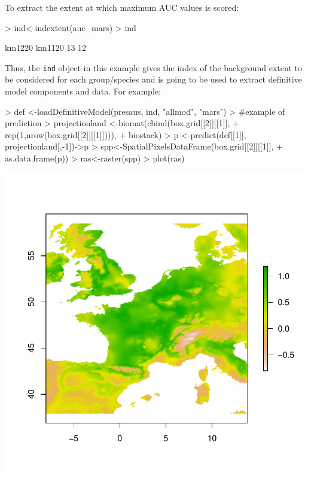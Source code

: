 \documentclass[10pt,a4paper]{report}
\begin{document}
To extract the extent at which maximum AUC values is scored:

\begin{Schunk}
\begin{Sinput}
> ind<-indextent(auc_mars)
> ind
\end{Sinput}
\begin{Soutput}
km1220 km1120 
    13     12 
\end{Soutput}
\end{Schunk}

Thus, the \texttt{ind} object in this example gives the index of the background extent to be considered for each group/species and is going to be used to extract definitive model components and data. For example:

\begin{Schunk}
\begin{Sinput}
> def <-loadDefinitiveModel(presaus, ind, "allmod", "mars")
> #example of prediction
> projectionland <-biomat(cbind(box.grid[[2]][[1]], 
+                     rep(1,nrow(box.grid[[2]][[1]]))), 
+                     biostack)
> p <-predict(def[[1]], projectionland[,-1])->p
> spp<-SpatialPixelsDataFrame(box.grid[[2]][[1]], 
+                             as.data.frame(p))
> ras<-raster(spp)
> plot(ras)
\end{Sinput}
\end{Schunk}
\includegraphics{mopa-mopa15}






\end{document}
